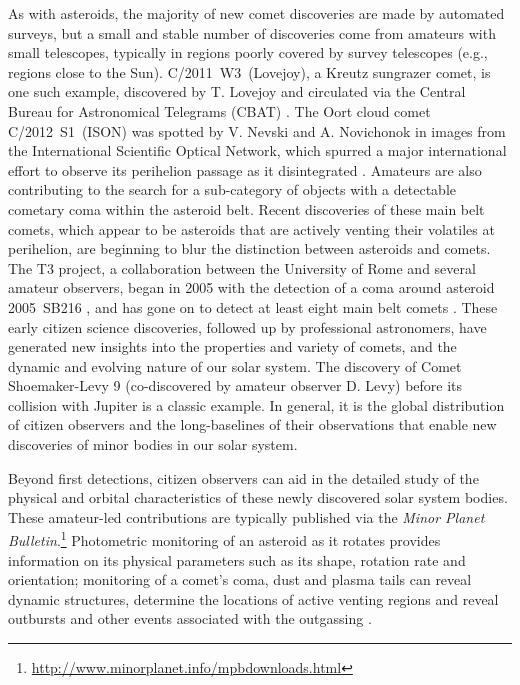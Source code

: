 \documentclass{ar2e}
\begin{document}
As with asteroids, the majority of new comet discoveries are made by automated
surveys, but a small and stable number of discoveries come from amateurs with
small telescopes, typically in regions poorly covered by survey telescopes
(e.g., regions close to the Sun).   C/2011~W3~(Lovejoy), a Kreutz sungrazer
comet, is one such example, discovered by T. Lovejoy and circulated via the
Central Bureau for Astronomical Telegrams (CBAT) \citep[e.g.,][]{12sekanina}. 
The Oort cloud comet C/2012~S1~(ISON) was spotted by V. Nevski and A. Novichonok
in images from the International Scientific Optical Network, which spurred a
major international effort to observe its perihelion passage as it disintegrated
\citep{14sekanina}.  Amateurs are also contributing to the search for a
sub-category of objects with a detectable cometary coma within the asteroid
belt.  Recent discoveries of these main belt comets, which appear to be
asteroids that are actively venting their volatiles at perihelion, are beginning
to blur the distinction between asteroids and comets.  The T3 project, a
collaboration between the University of Rome and several amateur observers,
began in 2005 with the detection of a coma around asteroid 2005~SB216
\citep{06buzzi}, and has gone on to detect at least eight main belt comets
\citep{14mousis_proam}.  These early citizen science discoveries, followed up by
professional astronomers, have generated new insights into the properties and
variety of comets, and the dynamic and evolving nature of our solar system.  The
discovery of Comet Shoemaker-Levy 9 (co-discovered by amateur observer D. Levy)
before its collision with Jupiter \citep{04harrington} is a classic example.
In general, it is the global distribution of citizen observers and the
long-baselines of their observations that enable new discoveries of minor bodies
in our solar system.

Beyond first detections, citizen observers can aid in the detailed study of the
physical and orbital characteristics of these newly discovered solar system
bodies. These amateur-led contributions are typically published via the
\textit{Minor Planet
Bulletin}.\footnote{\url{http://www.minorplanet.info/mpbdownloads.html}} 
Photometric monitoring of an asteroid as it rotates provides information on its
physical parameters such as its shape, rotation rate and orientation; 
monitoring of a comet's coma, dust and plasma tails can reveal dynamic
structures, determine the locations of active venting regions and reveal
outbursts and other events associated with the outgassing \citep[see][for a
comprehensive review]{14mousis_proam}.  
\end{document}
